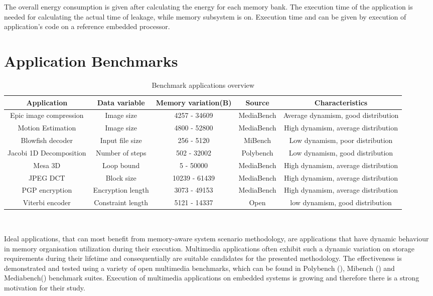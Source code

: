 \documentclass{acm_proc_article-sp}
\begin{document}
 The overall energy consumption is given after calculating the energy for each memory bank. The execution time of the application is needed for calculating the actual time of leakage, while memory subsystem is on. Execution time and can be given by execution of application's code on a reference embedded processor.   
 
\section{Application Benchmarks}
\label{sec:applications}

\begin{center}
\begin{table*}[!t]
\caption{Benchmark applications overview}
\label{tab:applications}
{\small
\hfill{}
\begin{tabular}{|c|c|c|c|c|}
\hline 
\textbf{Application} & \textbf{Data variable} & \textbf{Memory variation(B)} & \textbf{Source} & \textbf{Characteristics}\\ 
\hline 
Epic image compression & Image size & 4257 - 34609 & MediaBench & Average dynamism, good distribution\\ 
\hline 
Motion Estimation & Image size & 4800 - 52800 & MediaBench & High dynamism, average distribution\\ 
\hline 
Blowfish decoder & Input file size & 256 - 5120 & MiBench & Low dynamism, poor distribution\\ 
\hline 
Jacobi 1D Decomposition & Number of steps & 502 - 32002 & Polybench & Low dynamism, good distribution\\ 
\hline 
Mesa 3D & Loop bound & 5 - 50000 & MediaBench & High dynamism, average distribution\\ 
\hline 
JPEG DCT & Block size & 10239 - 61439 & MediaBench & High dynamism, average distribution\\ 
\hline 
PGP encryption & Encryption length & 3073 - 49153 & MediaBench & High dynamism, average distribution\\ 
\hline 
Viterbi encoder & Constraint length & 5121 - 14337 & Open & low dynamism, good distribution\\ 
\hline 
\end{tabular}}
\hfill{}
\\
\end{table*}
\end{center}

Ideal applications, that can most benefit from memory-aware system scenario methodology, are applications that have dynamic behaviour in memory organisation utilization during their execution. Multimedia applications often exhibit such a dynamic variation on storage requirements during their lifetime and consequentially are suitable candidates for the presented methodology. The effectiveness is demonstrated and tested using a variety of open multimedia benchmarks, which can be found in Polybench (\cite{Poly}), Mibench (\cite{mibench}) and Mediabench(\cite{mediabench}) benchmark suites. Execution of multimedia applications on embedded systems is growing and therefore there is a strong motivation for their study.
\end{document}

